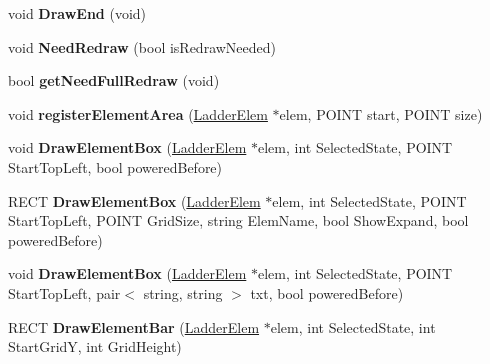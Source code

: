 \begin{DoxyCompactItemize}
\item 
\hypertarget{class_ladder_g_u_i_a8d54533c231efe46da6f72cbba19993e}{void {\bfseries Draw\-End} (void)}\label{class_ladder_g_u_i_a8d54533c231efe46da6f72cbba19993e}

\item 
\hypertarget{class_ladder_g_u_i_a9f8ff54b68a9fcd5387d4fa144e0be01}{void {\bfseries Need\-Redraw} (bool is\-Redraw\-Needed)}\label{class_ladder_g_u_i_a9f8ff54b68a9fcd5387d4fa144e0be01}

\item 
\hypertarget{class_ladder_g_u_i_a0733995d83f98f39dc9a1ea02f14b6a3}{bool {\bfseries get\-Need\-Full\-Redraw} (void)}\label{class_ladder_g_u_i_a0733995d83f98f39dc9a1ea02f14b6a3}

\item 
\hypertarget{class_ladder_g_u_i_a7791bdc080c9f75639d81ea40930bfd9}{void {\bfseries register\-Element\-Area} (\hyperlink{class_ladder_elem}{Ladder\-Elem} $\ast$elem, P\-O\-I\-N\-T start, P\-O\-I\-N\-T size)}\label{class_ladder_g_u_i_a7791bdc080c9f75639d81ea40930bfd9}

\item 
\hypertarget{class_ladder_g_u_i_a5660af98b03574a4e5f81631d5fa9a28}{void {\bfseries Draw\-Element\-Box} (\hyperlink{class_ladder_elem}{Ladder\-Elem} $\ast$elem, int Selected\-State, P\-O\-I\-N\-T Start\-Top\-Left, bool powered\-Before)}\label{class_ladder_g_u_i_a5660af98b03574a4e5f81631d5fa9a28}

\item 
\hypertarget{class_ladder_g_u_i_a581ce8afeebc92fd1d8f3e26b8acf7f5}{R\-E\-C\-T {\bfseries Draw\-Element\-Box} (\hyperlink{class_ladder_elem}{Ladder\-Elem} $\ast$elem, int Selected\-State, P\-O\-I\-N\-T Start\-Top\-Left, P\-O\-I\-N\-T Grid\-Size, string Elem\-Name, bool Show\-Expand, bool powered\-Before)}\label{class_ladder_g_u_i_a581ce8afeebc92fd1d8f3e26b8acf7f5}

\item 
\hypertarget{class_ladder_g_u_i_ac700f6ed3bcaaed07796b5be82c4a1ae}{void {\bfseries Draw\-Element\-Box} (\hyperlink{class_ladder_elem}{Ladder\-Elem} $\ast$elem, int Selected\-State, P\-O\-I\-N\-T Start\-Top\-Left, pair$<$ string, string $>$ txt, bool powered\-Before)}\label{class_ladder_g_u_i_ac700f6ed3bcaaed07796b5be82c4a1ae}

\item 
\hypertarget{class_ladder_g_u_i_a10e3a143a7a9fff23031f0ff65168f15}{R\-E\-C\-T {\bfseries Draw\-Element\-Bar} (\hyperlink{class_ladder_elem}{Ladder\-Elem} $\ast$elem, int Selected\-State, int Start\-Grid\-Y, int Grid\-Height)}\label{class_ladder_g_u_i_a10e3a143a7a9fff23031f0ff65168f15}


\end{DoxyCompactItemize}

